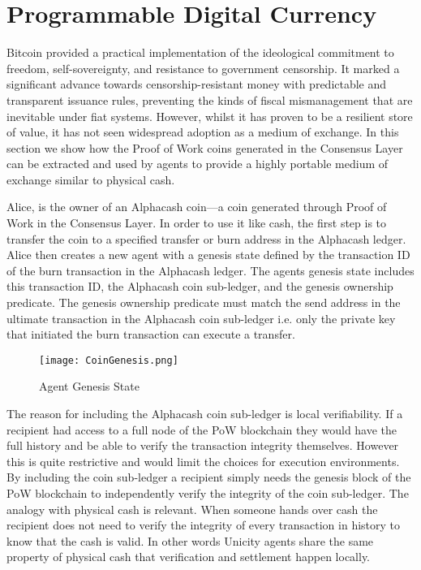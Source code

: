\documentclass{article}
\begin{document}
\section{Programmable Digital Currency}

Bitcoin provided a practical implementation of the ideological commitment to freedom, self-sovereignty, and resistance to government censorship.  It marked a significant advance towards censorship-resistant money with predictable and transparent issuance rules, preventing the kinds of fiscal mismanagement that are inevitable under fiat systems. However, whilst it has proven to be a resilient store of value, it has not seen widespread adoption as a medium of exchange. In this section we show how the Proof of Work coins generated in the Consensus Layer can be extracted and used by agents to provide a highly portable medium of exchange similar to physical cash.

\vspace{2mm}

Alice, is the owner of an Alphacash coin---a coin generated through Proof of Work in the Consensus Layer.  In order to use it like cash, the first step is to transfer the coin to a specified transfer or burn address in the Alphacash ledger. Alice then creates a new agent with a genesis state defined by the transaction ID of the burn transaction in the Alphacash ledger. The agents genesis state includes this transaction ID, the Alphacash coin sub-ledger, and the genesis ownership predicate. The genesis ownership predicate must match the send address in the ultimate transaction in the Alphacash coin sub-ledger i.e. only the private key that initiated the burn transaction can execute a transfer.

\begin{figure}[htbp]
    \centering
    \texttt{[image: CoinGenesis.png]}
    \caption{Agent Genesis State}
    \label{fig:GenesisEvent}
\end{figure}

The reason for including the Alphacash coin sub-ledger is local verifiability. If a recipient had access to a full node of the PoW blockchain they would have the full history and be able to verify the transaction integrity themselves. However this is quite restrictive and would limit the choices for execution environments. By including the coin sub-ledger a recipient simply needs the genesis block of the PoW blockchain to independently verify the integrity of the coin sub-ledger. The analogy with physical cash is relevant. When someone hands over cash the recipient does not need to verify the integrity of every transaction in history to know that the cash is valid. In other words Unicity agents share the same property of physical cash that verification and settlement happen locally. 
\vspace{2mm}
\end{document}

